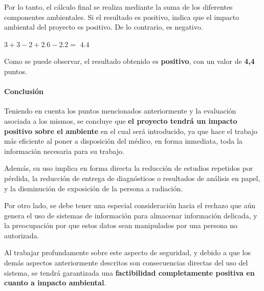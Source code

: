 Por lo tanto, el cálculo final se realiza mediante la suma de los diferentes componentes ambientales.
Si el resultado es positivo, indica que el impacto ambiental del proyecto es positivo.
De lo contrario, es negativo.

$3 + 3 - 2 + 2.6 - 2.2 = $ \textbf{$4.4$}

Como se puede observar, el resultado obtenido es \textbf{positivo}, con un valor de \textbf{4,4} puntos.


\paragraph{Conclusión}

	Teniendo en cuenta los puntos mencionados anteriormente y la evaluación asociada a los mismos, se concluye que \textbf{el proyecto tendrá un impacto positivo sobre el ambiente} en el cual será introducido, ya que hace el trabajo más eficiente al poner a disposición del médico, en forma inmediata, toda la información necesaria para su trabajo.

    Además, su uso implica en forma directa la reducción de estudios repetidos por pérdida, la reducción de entrega de diagnósticos o resultados de análisis en papel, y la disminución de exposición de la persona a radiación.
    
    Por otro lado, se debe tener una especial consideración hacia el rechazo que aún genera el uso de sistemas de información para almacenar información delicada, y la preocupación por que estos datos sean manipulados por una persona no autorizada.
    
    Al trabajar profundamente sobre este aspecto de seguridad, y debido a que los demás aspectos anteriormente descritos son consecuencias directas del uso del sistema, se tendrá garantizada una \textbf{factibilidad completamente positiva en cuanto a impacto ambiental}.


